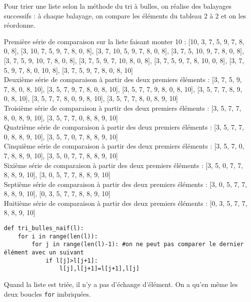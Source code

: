 \setcounter{numques}{0}
Pour trier une liste selon la méthode du tri à bulles, on réalise des balayages successifs : à chaque balayage, on compare les éléments du tableau 2 à 2 et on les réordonne. 

\ifprof
Première série de comparaison sur la liste faisant monter 10 : 
[10, 3, 7, 5, 9, 7, 8, 0, 8],
[3, 10, 7, 5, 9, 7, 8, 0, 8],
[3, 7, 10, 5, 9, 7, 8, 0, 8],
[3, 7, 5, 10, 9, 7, 8, 0, 8],
[3, 7, 5, 9, 10, 7, 8, 0, 8],
[3, 7, 5, 9, 7, 10, 8, 0, 8],
[3, 7, 5, 9, 7, 8, 10, 0, 8],
[3, 7, 5, 9, 7, 8, 0, 10, 8],
[3, 7, 5, 9, 7, 8, 0, 8, 10]\\
Deuxième série de comparaison à partir des deux premiers éléments :
[3, 7, 5, 9, 7, 8, 0, 8, 10],
[3, 5, 7, 9, 7, 8, 0, 8, 10],
[3, 5, 7, 7, 9, 8, 0, 8, 10],
[3, 5, 7, 7, 8, 9, 0, 8, 10],
[3, 5, 7, 7, 8, 0, 9, 8, 10],
[3, 5, 7, 7, 8, 0, 8, 9, 10]\\
Troisième série de comparaison à partir des deux premiers éléments :
[3, 5, 7, 7, 8, 0, 8, 9, 10],
[3, 5, 7, 7, 0, 8, 8, 9, 10]\\
Quatrième série de comparaison à partir des deux premiers éléments :
[3, 5, 7, 7, 0, 8, 8, 9, 10],
[3, 5, 7, 0, 7, 8, 8, 9, 10]\\
Cinquième série de comparaison à partir des deux premiers éléments :
[3, 5, 7, 0, 7, 8, 8, 9, 10],
[3, 5, 0, 7, 7, 8, 8, 9, 10]\\
Sixième série de comparaison à partir des deux premiers éléments :
[3, 5, 0, 7, 7, 8, 8, 9, 10],
[3, 0, 5, 7, 7, 8, 8, 9, 10]\\
Septième série de comparaison à partir des deux premiers éléments :
[3, 0, 5, 7, 7, 8, 8, 9, 10],
[0, 3, 5, 7, 7, 8, 8, 9, 10]\\
Huitième série de comparaison à partir des deux premiers éléments :
[0, 3, 5, 7, 7, 8, 8, 9, 10]
\else\fi

\ifprof
\begin{lstlisting}
def tri_bulles_naif(l):
    for i in range(len(l)):
        for j in range(len(l)-1): #on ne peut pas comparer le dernier élément avec un suivant
            if l[j]>l[j+1]:
                l[j],l[j+1]=l[j+1],l[j]
\end{lstlisting}
\else\fi

\ifprof
Quand la liste est triée, il n'y a pas d'échange d'élément. On a qu'en même les deux boucles \texttt{for} imbriquées.
\else\fi

